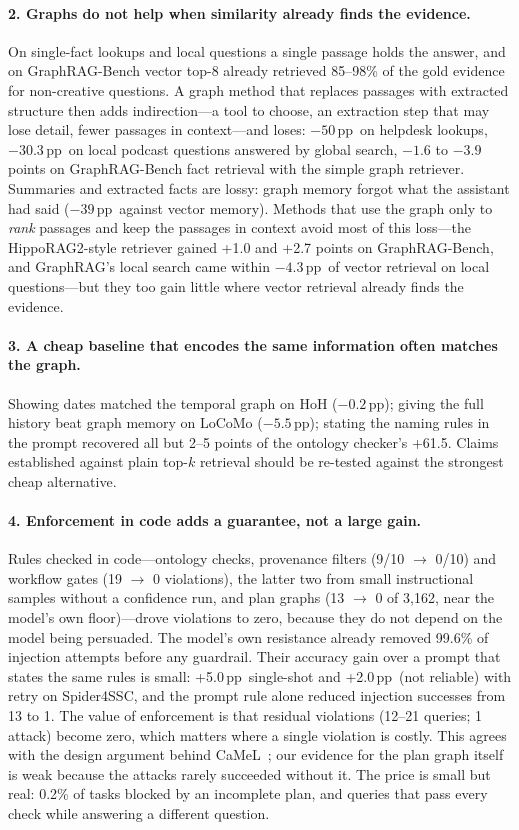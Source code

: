 \documentclass[11pt,a4paper]{article}
\newcommand{\pp}{\,pp}
\begin{document}
\paragraph{2. Graphs do not help when similarity already finds the evidence.} On single-fact lookups and local
questions a single passage holds the answer, and on GraphRAG-Bench vector top-8 already retrieved 85--98\% of the
gold evidence for non-creative questions. A graph method that replaces passages with extracted structure then adds
indirection---a tool to choose, an extraction step that may lose detail, fewer passages in context---and loses:
$-50$\pp\ on helpdesk lookups, $-30.3$\pp\ on local podcast questions answered by global search, $-1.6$ to $-3.9$ points on GraphRAG-Bench
fact retrieval with the simple graph retriever. Summaries and extracted facts are lossy: graph memory forgot what the assistant had said
($-39$\pp\ against vector memory). Methods that use the graph only to \emph{rank} passages and keep the passages
in context avoid most of this loss---the HippoRAG2-style retriever gained +1.0 and +2.7 points on GraphRAG-Bench, and
GraphRAG's local search came within $-4.3$\pp\ of vector retrieval on local questions---but they too gain little
where vector retrieval already finds the evidence.

\paragraph{3. A cheap baseline that encodes the same information often matches the graph.} Showing dates matched
the temporal graph on HoH ($-0.2$\pp); giving the full history beat graph memory on LoCoMo ($-5.5$\pp); stating the
naming rules in the prompt recovered all but 2--5 points of the ontology checker's +61.5. Claims established
against plain top-$k$ retrieval should be re-tested against the strongest cheap alternative.

\paragraph{4. Enforcement in code adds a guarantee, not a large gain.} Rules checked in code---ontology checks,
provenance filters (9/10 $\rightarrow$ 0/10) and workflow gates (19 $\rightarrow$ 0 violations), the latter two from small
instructional samples without a confidence run, and plan graphs (13 $\rightarrow$ 0 of 3{,}162, near the model's own
floor)---drove violations to zero, because they do not depend on the model being persuaded. The model's own resistance
already removed 99.6\% of injection attempts before any guardrail. Their accuracy gain over a
prompt that states the same rules is small: +5.0\pp\ single-shot and +2.0\pp\ (not reliable) with retry on
Spider4SSC, and the prompt rule alone reduced injection successes from 13 to 1. The value of enforcement is that
residual violations (12--21 queries; 1 attack) become zero, which matters where a single violation is costly. This
agrees with the design argument behind CaMeL~\cite{debenedetti2025camel}; our evidence for the plan graph itself is weak
because the attacks rarely succeeded without it. The price is small but real: 0.2\% of tasks blocked by an
incomplete plan, and queries that pass every check while answering a different question.
\end{document}
